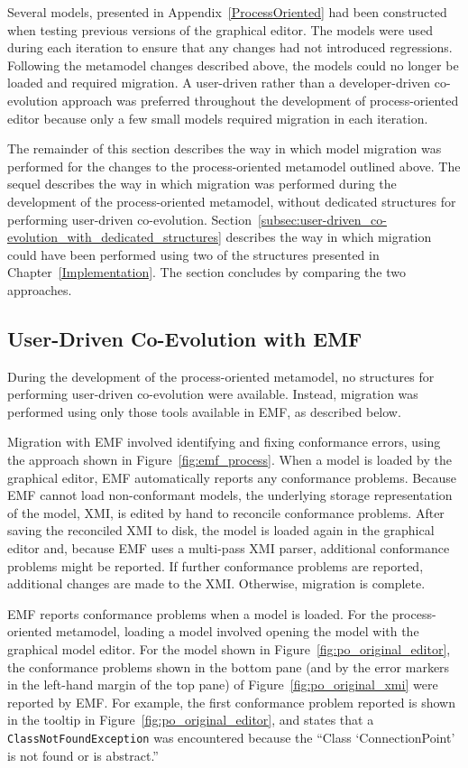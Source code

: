 Several models, presented in Appendix~\ref{ProcessOriented} had been constructed when testing previous versions of the graphical editor. The models were used during each iteration to ensure that any changes had not introduced regressions. Following the metamodel changes described above, the models could no longer be loaded and required migration. A user-driven rather than a developer-driven co-evolution approach was preferred throughout the development of process-oriented editor because only a few small models required migration in each iteration.

The remainder of this section describes the way in which model migration was performed for the changes to the process-oriented metamodel outlined above.
The sequel describes the way in which migration was performed during the development of the process-oriented metamodel, without dedicated structures for performing user-driven co-evolution. Section~\ref{subsec:user-driven_co-evolution_with_dedicated_structures} describes the way in which migration could have been performed using two of the structures presented in Chapter~\ref{Implementation}. The section concludes by comparing the two approaches.

\subsection{User-Driven Co-Evolution with EMF}
\label{subsec:user-driven_co-evolution_with_emf}
During the development of the process-oriented metamodel, no structures for performing user-driven co-evolution were available. Instead, migration was performed using only those tools available in EMF, as described below.

Migration with EMF involved identifying and fixing conformance errors, using the approach shown in Figure~\ref{fig:emf_process}. When a model is loaded by the graphical editor, EMF automatically reports any conformance problems. Because EMF cannot load non-conformant models, the underlying storage representation of the model, XMI, is edited by hand to reconcile conformance problems. After saving the reconciled XMI to disk, the model is loaded again in the graphical editor and, because EMF uses a multi-pass XMI parser, additional conformance problems might be reported. If further conformance problems are reported, additional changes are made to the XMI. Otherwise, migration is complete. 

EMF reports conformance problems when a model is loaded. For the process-oriented metamodel, loading a model involved opening the model with the graphical model editor. For the model shown in Figure~\ref{fig:po_original_editor}, the conformance problems shown in the bottom pane (and by the error markers in the left-hand margin of the top pane) of Figure~\ref{fig:po_original_xmi} were reported by EMF. For example, the first conformance problem reported is shown in the tooltip in Figure~\ref{fig:po_original_editor}, and states that a \texttt{ClassNotFoundException} was encountered because the ``Class `ConnectionPoint' is not found or is abstract.''

